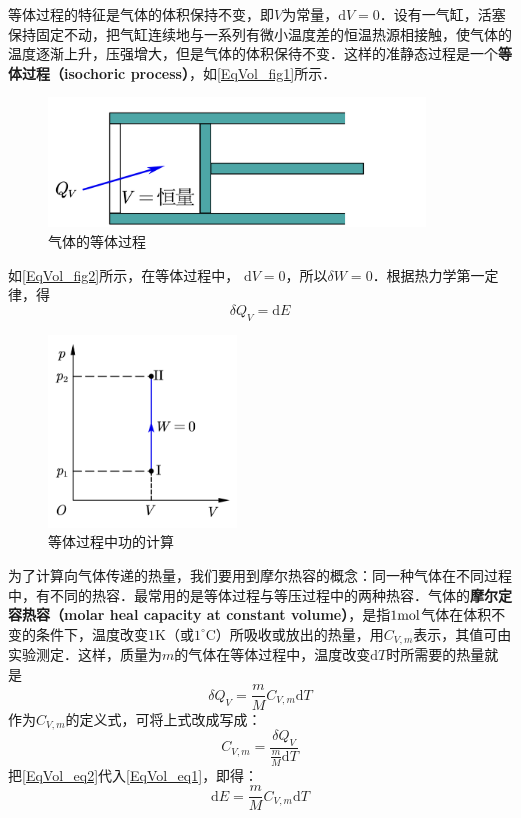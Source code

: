 

等体过程的特征是气体的体积保持不变，即$V $为常量，$\mathrm dV=0$．设有一气缸，活塞保持固定不动，把气缸连续地与一系列有微小温度差的恒温热源相接触，使气体的温度逐渐上升，压强增大，但是气体的体积保待不变．这样的准静态过程是一个\textbf{等体过程（isochoric process）}，如\autoref{EqVol_fig1}所示．
\begin{figure}[ht]
\centering
\includegraphics[width=10cm]{./figures/EqVol_1.pdf}
\caption{气体的等体过程} \label{EqVol_fig1}
\end{figure}
如\autoref{EqVol_fig2}所示，在等体过程中， $\mathrm dV=0$，所以$\delta W=0$．根据热力学第一定律，得
\begin{equation} \label{EqVol_eq1}
\delta Q_{V}=\mathrm{d} E 
\end{equation}
\begin{figure}[ht]
\centering
\includegraphics[width=5cm]{./figures/EqVol_2.pdf}
\caption{等体过程中功的计算} \label{EqVol_fig2}
\end{figure}
为了计算向气体传递的热量，我们要用到摩尔热容的概念：同一种气体在不同过程中，有不同的热容．最常用的是等体过程与等压过程中的两种热容．气体的\textbf{摩尔定容热容（molar heal capacity at constant volume）}，是指$1 \rm mol$气体在体积不变的条件下，温度改变$1\mathrm{K}$（或$1^\circ \mathrm{C}$）所吸收或放出的热量，用$C_{V,m}$表示，其值可由实验测定．这样，质量为$m $的气体在等体过程中，温度改变$\mathrm dT $时所需要的热量就是
\begin{equation} \label{EqVol_eq2}
\delta Q_{V}=\frac{m}{M} C_{V, {m}} \mathrm{d} T
\end{equation}
作为$C_{V,m}$的定义式，可将上式改成写成：
\begin{equation} 
C_{V, m}=\frac{\delta Q_{V}}{\frac{m}{M} \mathrm{d} T}
\end{equation}
把\autoref{EqVol_eq2}代入\autoref{EqVol_eq1}，即得：
\begin{equation} \label{EqVol_eq3}
\mathrm{d} E=\frac{m}{M} C_{V, m} \mathrm{d} T
\end{equation}

